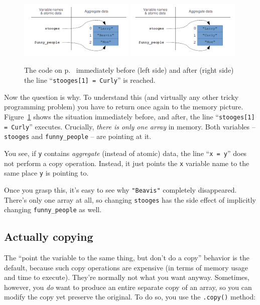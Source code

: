 \begin{figure}[ht]
\centering
\includegraphics[width=0.49\textwidth]{refNotCopy.png}
\includegraphics[width=0.49\textwidth]{refNotCopy2.png}
\caption{The code on p.~\pageref{code:refNotCopy} immediately before (left
side) and after (right side) the line ``\texttt{stooges[1] = \textquotesingle
Curly\textquotesingle}'' is reached.}
\label{fig:refNotCopy}
\end{figure}


Now the question is why. To understand this (and virtually any other tricky
programming problem) you have to return once again to the memory picture.
Figure~\ref{fig:refNotCopy} shows the situation immediately before, and after,
the line ``\texttt{stooges[1] = \textquotesingle Curly\textquotesingle}''
executes. Crucially, \textit{there is only one array} in memory. Both variables
-- \texttt{stooges} and \texttt{funny\_people} -- are pointing at it.

You see, if \texttt{y} contains \textit{aggregate} (instead of atomic) data,
the line ``\texttt{x = y}'' does not perform a copy operation. Instead, it just
points the \texttt{x} variable name to the same place \texttt{y} is pointing
to.

Once you grasp this, it's easy to see why \texttt{"Beavis"} completely
disappeared. There's only one array at all, so changing \texttt{stooges} has
the side effect of implicitly changing \texttt{funny\_people} as well.

\subsection{Actually copying}

The ``point the variable to the same thing, but don't do a copy'' behavior is
the default, because such copy operations are expensive (in terms of memory
usage and time to execute). They're normally not what you want anyway.
Sometimes, however, you \textit{do} want to produce an entire separate copy of
an array, so you can modify the copy yet preserve the original. To do so, you
use the \texttt{.copy()} method:

